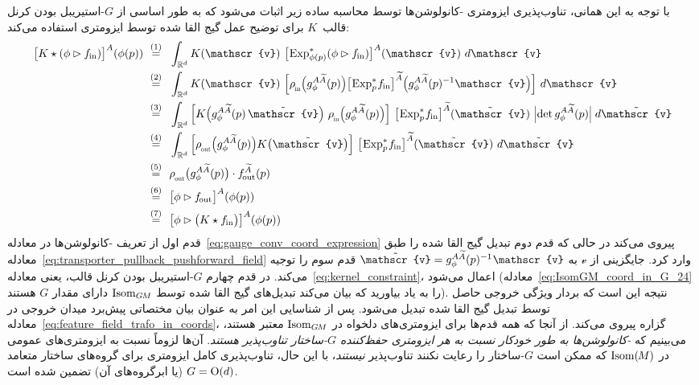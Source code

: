 با توجه به این همانی، تناوب‌پذیری ایزومتری \GM-کانولوشن‌ها
توسط محاسبه ساده زیر اثبات می‌شود که به طور اساسی از $G$-استیریبل بودن کرنل قالب~$K$ برای توضیح عمل گیج القا شده توسط ایزومتری استفاده می‌کند:
\begin{align}
	\big[ K \star (\phi \rhd \fin) \big]^A (\phi(p))
	\ \overset{(1)}{=}&\ \ 
	\int_{\R^d} K(\mathscr{v})\  \big[\mkern-2mu \Expsphip (\phi\rhd\fin) \big]^A (\mathscr{v})\ d\mathscr{v} \notag \\
	\ \overset{(2)}{=}&\ \ 
	\int_{\R^d} K(\mathscr{v})\ 
	\Big[ \rhoin\pig( g_\phi^{A\widetilde{A}}(p)\pig) \big[\mkern-2mu \Expspfin\big]^{\widetilde{A}} \pig(g_\phi^{A\widetilde{A}}(p)^{-1} \mathscr{v} \pig) \Big]\ d\mathscr{v} \notag \\
	\ \overset{(3)}{=}&\ \ 
	\int_{\R^d} \Big[ K\pig( g_\phi^{A\widetilde{A}}(p)\, \tilde{\mathscr{v}}\pig)\ \rhoin\pig( g_\phi^{A\widetilde{A}}(p)\pig) \Big]\ 
	\big[\mkern-2mu \Expspfin\big]^{\widetilde{A}} (\tilde{\mathscr{v}})\ 
	\pig|\mkern-3mu\det g_\phi^{A\widetilde{A}}(p)\pig|\; d\tilde{\mathscr{v}} \notag \\
	\ \overset{(4)}{=}&\ \ 
	\int_{\R^d} \Big[\rhoout\pig( g_\phi^{A\widetilde{A}}(p)\pig)  K\big(\tilde{\mathscr{v}}\big) \Big]\ 
	\big[\mkern-2mu \Expspfin\big]^{\widetilde{A}} (\tilde{\mathscr{v}})\ d\tilde{\mathscr{v}} \notag \\
	\ \overset{(5)}{=}&\ \ 
	\rhoout\big( g_\phi^{A\widetilde{A}}(p) \big) \cdot \fout^{\widetilde{A}}(p) \notag \\
	\ \overset{(6)}{=}&\ \ 
	\big[ \phi \rhd \fout \big]^A (\phi(p)) \notag \\
	\ \overset{(7)}{=}&\ \ 
	\big[ \phi \rhd \big(K \star \fin\big) \big]^A (\phi(p))
\end{align}
قدم اول از تعریف \GM-کانولوشن‌ها در معادله~\eqref{eq:gauge_conv_coord_expression} پیروی می‌کند در حالی که قدم دوم تبدیل گیج القا شده را طبق معادله~\eqref{eq:transporter_pullback_pushforward_field} وارد کرد.
جایگزینی از $\mathscr{v}$ به $\tilde{\mathscr{v}} = g_\phi^{A\widetilde{A}}(p)^{-1} \mkern1mu \mathscr{v}$ قدم سوم را توجیه می‌کند.
در قدم چهارم $G$-استیریبل بودن کرنل قالب، یعنی معادله~\eqref{eq:kernel_constraint}، اعمال می‌شود (معادله~\eqref{eq:IsomGM_coord_in_G_24} را به یاد بیاورید که بیان می‌کند تبدیل‌های گیج القا شده توسط $\operatorname{Isom}_{G\mkern-1.4muM}$ دارای مقدار $G$ هستند).
نتیجه این است که بردار ویژگی خروجی حاصل توسط تبدیل گیج القا شده تبدیل می‌شود.
پس از شناسایی این امر به عنوان بیان مختصاتی پیش‌برد میدان خروجی در معادله~\eqref{eq:feature_field_trafo_in_coords}، گزاره پیروی می‌کند.
از آنجا که همه قدم‌ها برای ایزومتری‌های دلخواه در $\operatorname{Isom}_{G\mkern-1.4muM}$ معتبر هستند، می‌بینیم که \emph{\GM-کانولوشن‌ها به طور خودکار نسبت به هر ایزومتری حفظ‌کننده $G$-ساختار تناوب‌پذیر هستند}.
آن‌ها لزوماً نسبت به ایزومتری‌های عمومی در $\operatorname{Isom}(\mkern-1.5mu M \mkern-.5mu)$ که ممکن است $G$-ساختار را رعایت نکنند تناوب‌پذیر \emph{نیستند}، با این حال، تناوب‌پذیری کامل ایزومتری برای گروه‌های ساختار متعامد $G=\operatorname{O}(d)$ (یا ابرگروه‌های آن) تضمین شده است.



